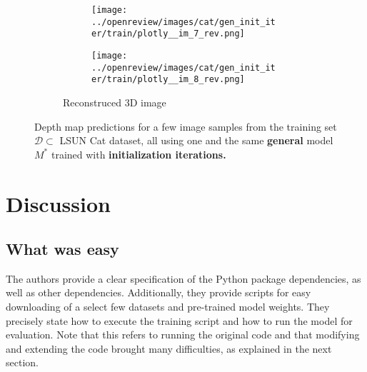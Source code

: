 \begin{figure}[!htb]
\begin{subfigure}{\textwidth}
\begin{subfigure}{0.24\textwidth}
    \centering
    \texttt{[image: ../openreview/images/cat/gen\_init\_iter/train/plotly\_\_im\_7\_rev.png]}
\end{subfigure}
\begin{subfigure}{0.24\textwidth}
    \centering
    \texttt{[image: ../openreview/images/cat/gen\_init\_iter/train/plotly\_\_im\_8\_rev.png]}
    \label{}
\end{subfigure}
\caption{Reconstruced 3D image}
\end{subfigure}
    \caption{Depth map predictions for a few image samples from the training set $\mathcal{D} \subset$ LSUN Cat dataset, all using one and the same \textbf{general} model $M^*$ trained with \textbf{initialization iterations.}}
    \label{fig:init_iter_general}
\end{figure}
\section{Discussion}


\subsection{What was easy}

The authors provide a clear specification of the Python package dependencies, as well as other dependencies. Additionally, they provide scripts for easy downloading of a select few datasets and pre-trained model weights. They precisely state how to execute the training script and how to run the model for evaluation. Note that this refers to running the original code and that modifying and extending the code brought many difficulties, as explained in the next section.

